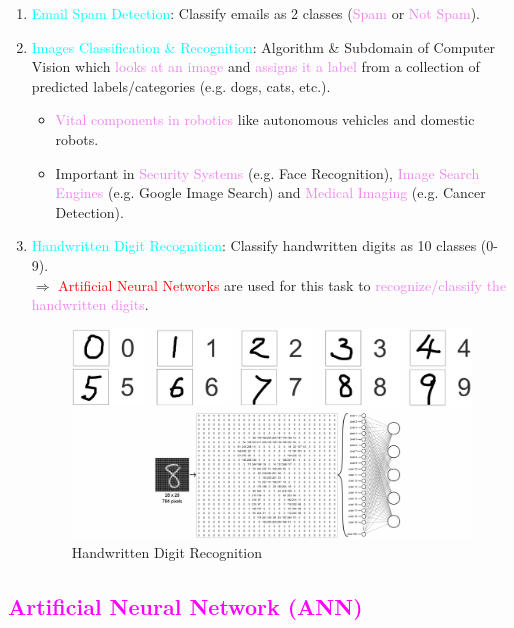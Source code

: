 \documentclass{book}
\begin{document}
\begin{enumerate}
    \item \textcolor{cyan}{Email Spam Detection}: Classify emails as 2 classes (\textcolor{violet}{Spam} or \textcolor{violet}{Not Spam}).
    \item \textcolor{cyan}{Images Classification \& Recognition}: Algorithm \& Subdomain of Computer Vision which \textcolor{violet}{looks at an image} and \textcolor{violet}{assigns it a label} from a collection of predicted labels/categories (e.g. dogs, cats, etc.).
    \begin{itemize}
        \item \textcolor{violet}{Vital components in robotics} like autonomous vehicles and domestic robots.
        \item Important in \textcolor{violet}{Security Systems} (e.g. Face Recognition), \textcolor{violet}{Image Search Engines} (e.g. Google Image Search) and \textcolor{violet}{Medical Imaging} (e.g. Cancer Detection).
    \end{itemize}
    \item \textcolor{cyan}{Handwritten Digit Recognition}: Classify handwritten digits as 10 classes (0-9).\\
    $\Rightarrow$ \textcolor{red}{Artificial Neural Networks} are used for this task to \textcolor{violet}{recognize/classify the handwritten digits}.
    \begin{figure}[h]
        \centering
        \includegraphics[scale=0.25]{chapter 6/ch6_figure2.jpeg}
        \caption{Handwritten Digit Recognition}
    \end{figure}
\end{enumerate}
\newpage
\textcolor{magenta}{\section{\textbf{Artificial Neural Network (ANN)}}}
\end{document}
